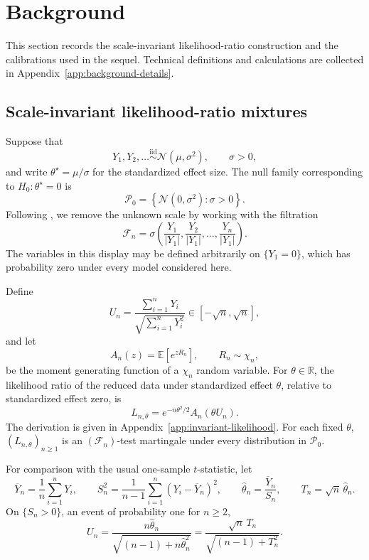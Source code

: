 \section{Background}
\label{sec:background}

This section records the scale-invariant likelihood-ratio construction
and the calibrations used in the sequel. Technical definitions and
calculations are collected in Appendix~\ref{app:background-details}.

\subsection{Scale-invariant likelihood-ratio mixtures}
\label{subsec:martingale-t-test}
\label{subsec:mixture-construction}

Suppose that
\[
  Y_1,Y_2,\ldots
  \stackrel{\mathrm{iid}}{\sim}
  \mathcal N(\mu,\sigma^2),
  \qquad \sigma>0,
\]
and write \(\theta^\star=\mu/\sigma\) for the standardized effect size.
The null family corresponding to \(H_0:\theta^\star=0\) is
\[
  \mathcal P_0
  =
  \left\{\mathcal N(0,\sigma^2):\sigma>0\right\}.
\]
Following \citet{Lai1976,PerezOrtiz2024,Wang2025}, we remove the
unknown scale by working with the filtration
\[
  \mathcal F_n
  =
  \sigma\left(
    \frac{Y_1}{|Y_1|},
    \frac{Y_2}{|Y_1|},\ldots,
    \frac{Y_n}{|Y_1|}
  \right).
\]
The variables in this display may be defined arbitrarily on
\(\{Y_1=0\}\), which has probability zero under every model considered
here.

Define
\begin{equation}
\label{eq:undef}
  U_n
  =
  \frac{\sum_{i=1}^nY_i}
       {\sqrt{\sum_{i=1}^nY_i^2}}
  \in[-\sqrt n,\sqrt n],
\end{equation}
and let
\[
  A_n(z)
  =
  \mathbb E\!\left[e^{zR_n}\right],
  \qquad R_n\sim\chi_n,
\]
be the moment generating function of a \(\chi_n\) random variable. For
\(\theta\in\mathbb R\), the likelihood ratio of the reduced data under
standardized effect \(\theta\), relative to standardized effect zero,
is
\begin{equation}
\label{eq:hthetadef}
  L_{n,\theta}
  =
  e^{-n\theta^2/2}A_n(\theta U_n).
\end{equation}
The derivation is given in Appendix~\ref{app:invariant-likelihood}.
For each fixed \(\theta\),
\((L_{n,\theta})_{n\geq1}\) is an
\((\mathcal F_n)\)-test martingale under every distribution in
\(\mathcal P_0\).

For comparison with the usual one-sample \(t\)-statistic, let
\[
  \overline Y_n=\frac1n\sum_{i=1}^nY_i,
  \qquad
  S_n^2=\frac1{n-1}\sum_{i=1}^n(Y_i-\overline Y_n)^2,
  \qquad
  \widehat\theta_n=\frac{\overline Y_n}{S_n},
  \qquad
  T_n=\sqrt n\,\widehat\theta_n.
\]
On \(\{S_n>0\}\), an event of probability one for \(n\geq2\),
\begin{equation}
\label{eq:undef-tstat}
  U_n
  =
  \frac{n\widehat\theta_n}
       {\sqrt{(n-1)+n\widehat\theta_n^2}}
  =
  \frac{\sqrt n\,T_n}
       {\sqrt{(n-1)+T_n^2}}.
\end{equation}

